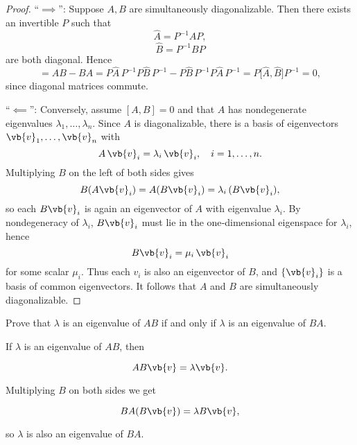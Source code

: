 \documentclass[a4paper,12pt]{report}
\begin{document}
\begin{proof}
“$\implies$”: Suppose $A,B$ are simultaneously diagonalizable.  Then there exists an invertible $P$ such that
\begin{equation}
\widehat A = P^{-1}AP,
\end{equation}
\begin{equation}
\widehat B = P^{-1}BP
\end{equation}
are both diagonal.  Hence
\begin{equation}
[A,B]
= AB-BA
= P\widehat A\,P^{-1}P\widehat B\,P^{-1}-P\widehat B\,P^{-1}P\widehat A\,P^{-1}
= P\bigl[\widehat A,\widehat B\bigr]P^{-1}
= 0,
\end{equation}
since diagonal matrices commute.

\medskip

“$\impliedby$”: Conversely, assume $[A,B]=0$ and that $A$ has nondegenerate eigenvalues $\lambda_1,\dots,\lambda_n$.  Since $A$ is diagonalizable, there is a basis of eigenvectors $\vb{v} _1,\dots,\vb{v} _n$ with
\begin{equation}
A\,\vb{v} _i = \lambda_i\,\vb{v} _i,
\quad i=1,\dots,n.
\end{equation}
Multiplying $B$ on the left of both sides gives
\begin{equation}
B(A\vb{v} _i) = A(B\vb{v} _{i} ) = \lambda_i\,(B\vb{v} _i),
\end{equation}
so each $B\vb{v} _i$ is again an eigenvector of $A$ with eigenvalue $\lambda_i$.  By nondegeneracy of $\lambda_i$, $B\vb{v} _i$ must lie in the one‐dimensional eigenspace for $\lambda_i$, hence
\begin{equation}
B\vb{v} _i = \mu_i\,\vb{v} _i
\end{equation}
for some scalar $\mu_i$.  Thus each $v_i$ is also an eigenvector of $B$, and $\{\vb{v} _i\}$ is a basis of common eigenvectors.  It follows that $A$ and $B$ are simultaneously diagonalizable.
\end{proof}

{Prove that \(\lambda \) is an eigenvalue of \(AB\) if and only if \(\lambda \) is an eigenvalue of \(BA\).}
{If \(\lambda \) is an eigenvalue of \(AB\), then 

\begin{equation}
    AB\vb{v} = \lambda \vb{v} .
\end{equation}

Multiplying \(B\) on both sides we get 

\begin{equation}
    BA(B\vb{v} ) = \lambda B\vb{v},
\end{equation}

so \(\lambda \) is also an eigenvalue of \(BA\). 
} 
\end{document}
